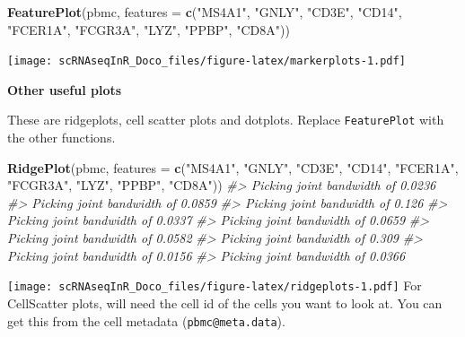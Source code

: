 \documentclass[
]{book}
\newenvironment{Shaded}{\begin{snugshade}}{\end{snugshade}}
\newcommand{\AttributeTok}[1]{\textcolor[rgb]{0.13,0.29,0.53}{#1}}
\newcommand{\CommentTok}[1]{\textcolor[rgb]{0.56,0.35,0.01}{\textit{#1}}}
\newcommand{\FunctionTok}[1]{\textcolor[rgb]{0.13,0.29,0.53}{\textbf{#1}}}
\newcommand{\NormalTok}[1]{#1}
\newcommand{\StringTok}[1]{\textcolor[rgb]{0.31,0.60,0.02}{#1}}
\begin{document}
\begin{Shaded}
\begin{Highlighting}[]
\FunctionTok{FeaturePlot}\NormalTok{(pbmc, }\AttributeTok{features =} \FunctionTok{c}\NormalTok{(}\StringTok{"MS4A1"}\NormalTok{, }\StringTok{"GNLY"}\NormalTok{, }\StringTok{"CD3E"}\NormalTok{, }\StringTok{"CD14"}\NormalTok{, }\StringTok{"FCER1A"}\NormalTok{, }\StringTok{"FCGR3A"}\NormalTok{, }\StringTok{"LYZ"}\NormalTok{, }\StringTok{"PPBP"}\NormalTok{, }\StringTok{"CD8A"}\NormalTok{))}
\end{Highlighting}
\end{Shaded}

\texttt{[image: scRNAseqInR\_Doco\_files/figure-latex/markerplots-1.pdf]}

\textbf{Other useful plots}

These are ridgeplots, cell scatter plots and dotplots. Replace \texttt{FeaturePlot} with the other functions.

\begin{Shaded}
\begin{Highlighting}[]
\FunctionTok{RidgePlot}\NormalTok{(pbmc, }\AttributeTok{features =} \FunctionTok{c}\NormalTok{(}\StringTok{"MS4A1"}\NormalTok{, }\StringTok{"GNLY"}\NormalTok{, }\StringTok{"CD3E"}\NormalTok{, }\StringTok{"CD14"}\NormalTok{, }\StringTok{"FCER1A"}\NormalTok{, }\StringTok{"FCGR3A"}\NormalTok{, }\StringTok{"LYZ"}\NormalTok{, }\StringTok{"PPBP"}\NormalTok{, }\StringTok{"CD8A"}\NormalTok{))}
\CommentTok{\#\textgreater{} Picking joint bandwidth of 0.0236}
\CommentTok{\#\textgreater{} Picking joint bandwidth of 0.0859}
\CommentTok{\#\textgreater{} Picking joint bandwidth of 0.126}
\CommentTok{\#\textgreater{} Picking joint bandwidth of 0.0337}
\CommentTok{\#\textgreater{} Picking joint bandwidth of 0.0659}
\CommentTok{\#\textgreater{} Picking joint bandwidth of 0.0582}
\CommentTok{\#\textgreater{} Picking joint bandwidth of 0.309}
\CommentTok{\#\textgreater{} Picking joint bandwidth of 0.0156}
\CommentTok{\#\textgreater{} Picking joint bandwidth of 0.0366}
\end{Highlighting}
\end{Shaded}

\texttt{[image: scRNAseqInR\_Doco\_files/figure-latex/ridgeplots-1.pdf]}
For CellScatter plots, will need the cell id of the cells you want to look at. You can get this from the cell metadata (\texttt{pbmc@meta.data}).
\end{document}
